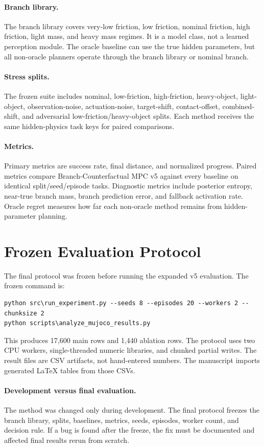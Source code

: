 \documentclass{article}
\newcommand{\methodv}{Branch-Counterfactual MPC v5}
\begin{document}
\paragraph{Branch library.}
The branch library covers very-low friction, low friction, nominal friction, high friction, light mass, and heavy mass regimes.  It is a model class, not a learned perception module.  The oracle baseline can use the true hidden parameters, but all non-oracle planners operate through the branch library or nominal branch.

\paragraph{Stress splits.}
The frozen suite includes nominal, low-friction, high-friction, heavy-object, light-object, observation-noise, actuation-noise, target-shift, contact-offset, combined-shift, and adversarial low-friction/heavy-object splits.  Each method receives the same hidden-physics task keys for paired comparisons.

\paragraph{Metrics.}
Primary metrics are success rate, final distance, and normalized progress.  Paired metrics compare \methodv{} against every baseline on identical split/seed/episode tasks.  Diagnostic metrics include posterior entropy, near-true branch mass, branch prediction error, and fallback activation rate.  Oracle regret measures how far each non-oracle method remains from hidden-parameter planning.

\section{Frozen Evaluation Protocol}

The final protocol was frozen before running the expanded v5 evaluation.  The frozen command is:
\begin{verbatim}
python src\run_experiment.py --seeds 8 --episodes 20 --workers 2 --chunksize 2
python scripts\analyze_mujoco_results.py
\end{verbatim}
This produces 17,600 main rows and 1,440 ablation rows.  The protocol uses two CPU workers, single-threaded numeric libraries, and chunked partial writes.  The result files are CSV artifacts, not hand-entered numbers.  The manuscript imports generated LaTeX tables from those CSVs.

\paragraph{Development versus final evaluation.}
The method was changed only during development.  The final protocol freezes the branch library, splits, baselines, metrics, seeds, episodes, worker count, and decision rule.  If a bug is found after the freeze, the fix must be documented and affected final results rerun from scratch.
\end{document}
